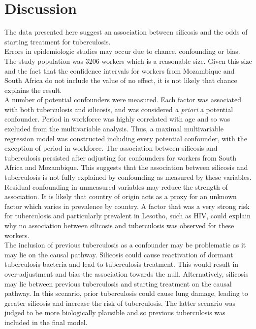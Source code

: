 \documentclass[11pt,a4paper,twoside]{article}\usepackage{graphicx, color}
\begin{document}
\section{Discussion}
 The data presented here suggest an association between silicosis and the odds of starting treatment for tuberculosis. \\ \indent
 Errors in epidemiologic studies may occur due to chance, confounding or bias. The study population was 3206 workers which is a reasonable size. 
 Given this size and the fact that the confidence intervals for workers from Mozambique and South Africa do not include the value of no effect, it is not likely that chance explains the result.  \\ \indent
 A number of potential confounders were measured. 
 Each factor was associated with both tuberculosis and silicosis, and was considered \textit{a priori} a potential confounder. 
 Period in workforce was highly correlated with age and so was excluded from the multivariable analysis.
 Thus, a maximal multivariable regression model was constructed including every potential confounder, with the exception of period in workforce. 
 The association between silicosis and tuberculosis persisted after adjusting for confounders for workers from South Africa and Mozambique. 
This suggests that the association between silicosis and tuberculosis is not fully explained by confounding as measured by these variables. Residual confounding in unmeasured variables may reduce the strength of association. 
It is likely that country of origin acts as a proxy for an unknown factor which varies in prevalence by country. 
A factor that was a very strong risk for tuberculosis and particularly prevalent in Lesotho, such as HIV, could explain why no association between silicosis and tuberculosis was observed for these workers. \\ \indent
The inclusion of previous tuberculosis as a confounder may be problematic as it may lie on the causal pathway. 
Silicosis could cause reactivation of dormant tuberculosis bacteria and lead to tuberculosis treatment.
This would result in over-adjustment and bias the association towards the null. 
Alternatively, silicosis may lie between previous tuberculosis and starting treatment on the causal pathway. 
In this scenario, prior tuberculosis could cause lung damage, leading to greater silicosis and increase the risk of tuberculosis. 
The latter scenario was judged to be more biologically plausible and so previous tuberculosis was included in the final model. \\ \indent
\end{document}
